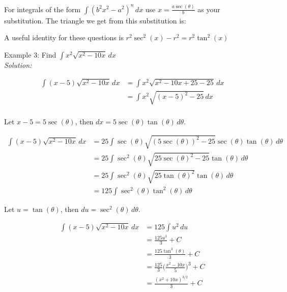 \documentclass[16pt]{article}
\theoremstyle{remark}
\begin{document}
For integrals of the form $\displaystyle{\int (b^2x^2 -a^2)^n \,dx}$ use $\displaystyle{x=\frac{a\sec(\theta)}{b}}$ as your substitution. The triangle we get from this substitution is:

\begin{center}
\end{center}
A useful identity for these questions is $r^2 \sec^2 (x) - r^2 = r^2 \tan^2(x)$

\begin{mdframed}[style=TheoremFrame]
Example 3: Find $\displaystyle{ \int x^2 \sqrt{x^2 - 10x} \, dx }$\\

\textit{Solution:}

\begin{align*}
\int (x-5) \sqrt{x^2 - 10x} \, dx &= \int x^2 \sqrt{x^2 - 10x+ 25 - 25} \, dx \\[1.5ex]
&= \int x^2 \sqrt{(x-5)^2 - 25} \, dx\\
\end{align*}
\begin{center}
Let $x -5 = 5\sec(\theta)$, then $dx = 5 \sec(\theta) \tan(\theta) \, d\theta$.
\end{center}
\begin{align*}
\int (x-5) \sqrt{x^2 - 10x} \, dx &= 25 \int \sec(\theta) \sqrt{(5\sec(\theta))^2 - 25} \sec(\theta) \tan(\theta) \, d\theta\\[1.5ex]
&= 25 \int \sec^2(\theta) \sqrt{25\sec(\theta)^2 - 25}\tan(\theta) \, d\theta\\[1.5ex]
&= 25 \int \sec^2(\theta) \sqrt{25\tan(\theta)^2}\tan(\theta) \, d\theta\\[1.5ex]
&= 125 \int \sec^2(\theta)\tan^2(\theta) \, d\theta
\end{align*}
\begin{center}
Let $u = \tan(\theta)$, then $du = \sec^2(\theta) \, d\theta$.
\end{center}
\begin{align*}
\int (x-5) \sqrt{x^2 - 10x} \, dx &= 125 \int u^2 \, du\\[1.5ex]
&= \frac{125u^3}{3}+C\\[1.5ex]
&= \frac{125\tan^3(\theta)}{3}+C\\[1.5ex]
&= \frac{125}{3} \bigg(\frac{x^2-10x}{5} \bigg)^3 + C\\[1.5ex]
&= \frac{(x^2+10x)^{3/2}}{3} + C
\end{align*}
\end{mdframed}
\end{document}
